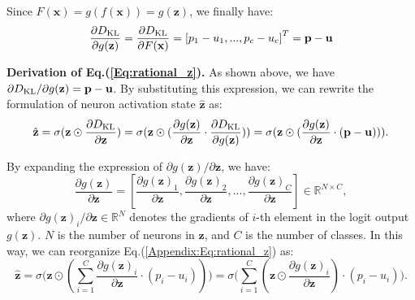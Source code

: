 \documentclass{article} \usepackage{iclr2024_conference,times}
\newcommand{\bfstart}[1]{\noindent\textbf{#1.}}
\begin{document}
Since $F(\mathbf{x}) = g(f(\mathbf{x})) = g(\mathbf{z})$, we finally have: 
\begin{equation}
	\frac{\partial{D_{\rm KL}}}{\partial g(\mathbf{z})} = \frac{\partial{D_{\rm KL}}}{\partial F(\mathbf{x})} = {[p_1 - u_1, ..., p_c - u_c]}^T = \mathbf{p}-\mathbf{u} 
\end{equation}


\bfstart{Derivation of Eq.(\ref{Eq:rational_z})} 
As shown above, we have ${\partial{D_{\rm KL}}}/{\partial g(\mathbf{z})} = \mathbf{p}-\mathbf{u}$. By substituting this expression, we can rewrite the formulation of neuron activation state $\hat{\mathbf{z}}$ as:
\begin{equation}
	\hat{\mathbf{z}} = \sigma(\mathbf{z} \odot \frac{\partial{D_{\rm KL}}}{\partial \mathbf{z}}) = 
	\sigma(\mathbf{z} \odot (\frac{\partial g(\mathbf{z})}{\partial \mathbf{z}} \cdot \frac{\partial{D_{\rm KL}}}{\partial g(\mathbf{z})})) = 
	\sigma(\mathbf{z} \odot (\frac{\partial g(\mathbf{z})}{\partial \mathbf{z}} \cdot (\mathbf{p}-\mathbf{u}))).
	\label{Appendix:Eq:rational_z}
\end{equation}

By expanding the expression of  ${\partial g(\mathbf{z})}/{\partial \mathbf{z}}$, we have:
\begin{equation}
\frac{\partial g(\mathbf{z})}{\partial \mathbf{z}} = [\frac{\partial g(\mathbf{z})_1}{\partial \mathbf{z}}, \frac{\partial g(\mathbf{z})_2}{\partial \mathbf{z}}, ..., \frac{\partial g(\mathbf{z})_C}{\partial \mathbf{z}}] \in \mathbb{R}^{N \times C},
\end{equation}
where ${\partial g(\mathbf{z})_i}/{\partial \mathbf{z}} \in \mathbb{R}^{N}$ denotes the gradients of $i$-th element in the logit output $g(\mathbf{z})$. $N$ is the number of neurons in $\mathbf{z}$, and $C$ is the number of classes. In this way, we can reorganize Eq.(\ref{Appendix:Eq:rational_z}) as:
\begin{equation}
	\hat{\mathbf{z}} = 
	\sigma \Big( \mathbf{z} \odot (\sum_{i=1}^{C} \frac{\partial g(\mathbf{z})_i}{\partial \mathbf{z}} \cdot (p_i - u_i)) \Big) =
	\sigma \Big(\sum_{i=1}^{C} (\mathbf{z} \odot \frac{\partial g(\mathbf{z})_i}{\partial \mathbf{z}}) \cdot (p_i - u_i) \Big).
	\label{Appendix:Eq:rational_z2}
\end{equation}
\end{document}
